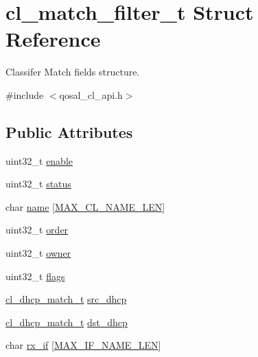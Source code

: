 \hypertarget{structcl__match__filter__t}{\section{cl\-\_\-match\-\_\-filter\-\_\-t Struct Reference}
\label{structcl__match__filter__t}
}


Classifer Match fields structure.  




{\ttfamily \#include $<$qosal\-\_\-cl\-\_\-api.\-h$>$}

\subsection*{Public Attributes}
\begin{DoxyCompactItemize}
\item 
uint32\-\_\-t \hyperlink{structcl__match__filter__t_abb961ab5e05074003112e334646955b8}{enable}
\item 
uint32\-\_\-t \hyperlink{structcl__match__filter__t_ae03c1c223e9dc94b6f91c665f604b1d2}{status}
\item 
char \hyperlink{structcl__match__filter__t_afc0fa04b66e0e2e9427b6f0ef139fafe}{name} \mbox{[}\hyperlink{group__FAPI__QOS__CLASS_ga34277a18827d255a596f886d8a9f201b}{M\-A\-X\-\_\-\-C\-L\-\_\-\-N\-A\-M\-E\-\_\-\-L\-E\-N}\mbox{]}
\item 
uint32\-\_\-t \hyperlink{structcl__match__filter__t_ae41a40e7a69a752ce76c02052af28d81}{order}
\item 
uint32\-\_\-t \hyperlink{structcl__match__filter__t_ad3385b677ff9b1d4590d8b3efd4be874}{owner}
\item 
uint32\-\_\-t \hyperlink{structcl__match__filter__t_ab37ad5c104db0aa7323f66093a822f5c}{flags}
\item 
\hyperlink{structcl__dhcp__match__t}{cl\-\_\-dhcp\-\_\-match\-\_\-t} \hyperlink{structcl__match__filter__t_a9d90c29a97a7f4c430dfbdf6c40fc9c7}{src\-\_\-dhcp}
\item 
\hyperlink{structcl__dhcp__match__t}{cl\-\_\-dhcp\-\_\-match\-\_\-t} \hyperlink{structcl__match__filter__t_af34f72c117557e50b1d5fb3bf0aa1733}{dst\-\_\-dhcp}
\item 
char \hyperlink{structcl__match__filter__t_af705c456c2a3101586b302755ca75960}{rx\-\_\-if} \mbox{[}\hyperlink{group__FAPI__QOS__GENERAL_ga53a5c7c867e818bc8b6dea3105a90f62}{M\-A\-X\-\_\-\-I\-F\-\_\-\-N\-A\-M\-E\-\_\-\-L\-E\-N}\mbox{]}
\item 

\end{DoxyCompactItemize}
